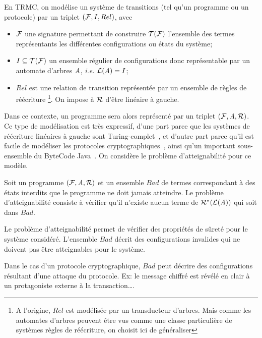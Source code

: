 En TRMC, on modélise un système de transitions (tel qu'un programme ou un protocole) par un triplet $(\mathcal{F}, I, Rel)$,
avec
\begin{itemize}
\item
$\mathcal{F}$ une signature permettant de construire $\mathcal{T(F)}$ l'ensemble des termes représentants les différentes configurations ou états
du système;

\item
  $I \subseteq \mathcal{T(F)}$ un ensemble régulier de configurations donc représentable par un automate d'arbres $\mathit A$, 
  \textit{i.e.} $\mathcal{L}(\mathit A)=I$;

\item $Rel$ est une relation de transition représentée par un ensemble de règles de réécriture
  \footnote{\footnotesize A l'origine, $Rel$ est modélisée par un transducteur d'arbres.
    Mais comme les automates d'arbres peuvent être vus comme une classe particulière de 
    systèmes règles de réécriture, on choisit ici de généraliser}.
  On impose à $\mathcal R$ d'être linéaire à gauche.
\end{itemize}

\noindent
Dans ce contexte, un programme sera alors représenté par un triplet $(\mathcal{F},\mathit A,\mathcal R)$.
Ce type de modélisation est très expressif, d'une part parce que les systèmes de réécriture
linéaires à gauche sont Turing-complet~\cite{HUET-78}, et d'autre part parce qu'il est facile de 
modéliser les protocoles cryptographiques~\cite{GenetK-CADE00}, ainsi qu'un
important sous-ensemble du ByteCode Java~\cite{BoichutGJL-RTA07}.
On considère le problème d'atteignabilité pour ce modèle.

\begin{definition}
\label{def:reachability}
Soit un programme $(\mathcal{F},\mathit A,\mathcal R)$ et un ensemble $Bad$ de termes correspondant à des états
interdits que le programme ne doit jamais atteindre.
Le problème d'atteignabilité consiste à vérifier qu'il n'existe 
aucun terme de $\mathcal R^*(\mathcal{L}(\mathit A))$ qui soit dans $Bad$.
\end{definition}

Le problème d'atteignabilité permet de vérifier des propriétés de sûreté
pour le système considéré. L'ensemble $Bad$ décrit des configurations invalides 
qui ne doivent pas être atteignables pour le système.

Dans le cas d'un protocole cryptographique, $Bad$ peut décrire des
configurations résultant d'une attaque du protocole. Ex: le message
chiffré est révélé en clair à un protagoniste externe à la
transaction\dots.

